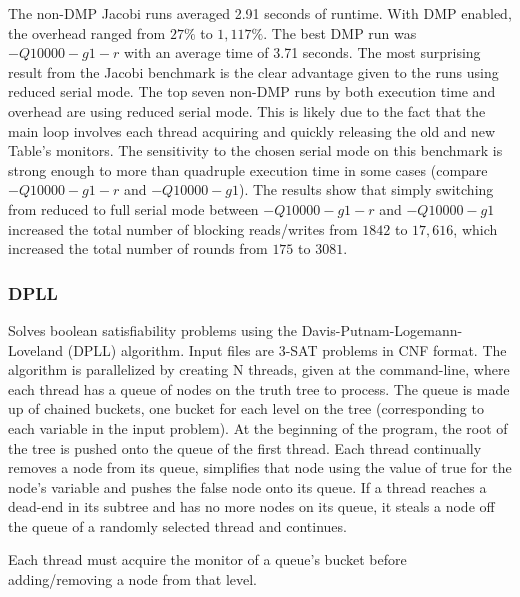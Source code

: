 The non-DMP Jacobi runs averaged 2.91 seconds of runtime.  With DMP
enabled, the overhead ranged from $27\%$ to $1,117\%$.  The best DMP
run was $-Q10000 -g1 -r$ with an average time of 3.71 seconds.  The
most surprising result from the Jacobi benchmark is the clear
advantage given to the runs using reduced serial mode.  The top seven
non-DMP runs by both execution time and overhead are using reduced
serial mode.  This is likely due to the fact that the main loop
involves each thread acquiring and quickly releasing the old and new
Table's monitors.  The sensitivity to the chosen serial mode on this
benchmark is strong enough to more than quadruple execution time in
some cases (compare $-Q10000 -g1 -r$ and $-Q10000 -g1$).  The results
show that simply switching from reduced to full serial mode between
$-Q10000 -g1 -r$ and $-Q10000 -g1$ increased the total number of
blocking reads/writes from $1842$ to $17,616$, which increased the
total number of rounds from $175$ to $3081$.

\subsubsection{DPLL}

Solves boolean satisfiability problems using the
Davis-Putnam-Logemann-Loveland (DPLL) algorithm.  Input files are
3-SAT problems in CNF format.  The algorithm is parallelized by
creating N threads, given at the command-line, where each thread has a
queue of nodes on the truth tree to process.  The queue is made up of
chained buckets, one bucket for each level on the tree (corresponding
to each variable in the input problem).  At the beginning of the
program, the root of the tree is pushed onto the queue of the first
thread.  Each thread continually removes a node from its queue,
simplifies that node using the value of true for the node's variable
and pushes the false node onto its queue.  If a thread reaches a
dead-end in its subtree and has no more nodes on its queue, it steals
a node off the queue of a randomly selected thread and continues.

Each thread must acquire the monitor of a queue's bucket before
adding/removing a node from that level.

